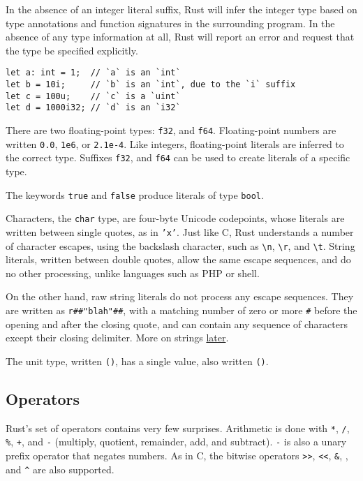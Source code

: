 \documentclass[]{article}
\begin{document}
In the absence of an integer literal suffix, Rust will infer the integer
type based on type annotations and function signatures in the
surrounding program. In the absence of any type information at all, Rust
will report an error and request that the type be specified explicitly.

\begin{verbatim}
let a: int = 1;  // `a` is an `int`
let b = 10i;     // `b` is an `int`, due to the `i` suffix
let c = 100u;    // `c` is a `uint`
let d = 1000i32; // `d` is an `i32`
\end{verbatim}

There are two floating-point types: \texttt{f32}, and \texttt{f64}.
Floating-point numbers are written \texttt{0.0}, \texttt{1e6}, or
\texttt{2.1e-4}. Like integers, floating-point literals are inferred to
the correct type. Suffixes \texttt{f32}, and \texttt{f64} can be used to
create literals of a specific type.

The keywords \texttt{true} and \texttt{false} produce literals of type
\texttt{bool}.

Characters, the \texttt{char} type, are four-byte Unicode codepoints,
whose literals are written between single quotes, as in \texttt{'x'}.
Just like C, Rust understands a number of character escapes, using the
backslash character, such as \texttt{\textbackslash{}n},
\texttt{\textbackslash{}r}, and \texttt{\textbackslash{}t}. String
literals, written between double quotes, allow the same escape
sequences, and do no other processing, unlike languages such as PHP or
shell.

On the other hand, raw string literals do not process any escape
sequences. They are written as \texttt{r\#\#"blah"\#\#}, with a matching
number of zero or more \texttt{\#} before the opening and after the
closing quote, and can contain any sequence of characters except their
closing delimiter. More on strings
\hyperref[vectors-and-strings]{later}.

The unit type, written \texttt{()}, has a single value, also written
\texttt{()}.

\subsection{Operators}\label{operators}

Rust's set of operators contains very few surprises. Arithmetic is done
with \texttt{*}, \texttt{/}, \texttt{\%}, \texttt{+}, and \texttt{-}
(multiply, quotient, remainder, add, and subtract). \texttt{-} is also a
unary prefix operator that negates numbers. As in C, the bitwise
operators \texttt{\textgreater{}\textgreater{}},
\texttt{\textless{}\textless{}}, \texttt{\&}, \texttt{\textbar{}}, and
\texttt{\^{}} are also supported.
\end{document}
